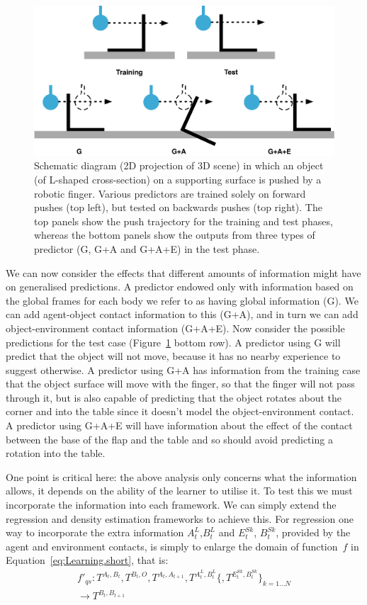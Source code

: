 \begin{figure}[b]
\centerline{\includegraphics[width=0.8\columnwidth]{BackPushToyExample}}
\caption[ToyExample]{Schematic diagram (2D projection of 3D scene)
in which an object (of L-shaped cross-section) on a supporting surface
is pushed by a robotic finger. 
Various predictors are trained solely on forward pushes (top left), but tested on backwards pushes (top right). The top panels show the push trajectory for the training and test phases, whereas the bottom panels show the outputs from three types of predictor (G, G+A and G+A+E) in the test phase.}
\label{fig:ToyExample}
\end{figure}

We can now consider the effects that different amounts of information
might have on generalised predictions. A predictor endowed only with
information based on the global frames for each body we refer to as
having global information (G). We can add agent-object contact
information to this (G+A), and in turn we can add object-environment
contact information (G+A+E). Now consider the possible predictions for
the test case (Figure~\ref{fig:ToyExample} bottom row). A predictor
using G will predict that the object will not move, because it has no
nearby experience to suggest otherwise. A predictor using G+A has
information from the training case that the object surface will move
with the finger, so that the finger will not pass through it, but is
also capable of predicting that the object rotates about the corner
and into the table since it doesn't model the object-environment
contact. A predictor using G+A+E will have information about the
effect of the contact between the base of the flap and the table and
so should avoid predicting a rotation into the table.

One point is critical here: the above analysis only concerns what the
information allows, it depends on the ability of the learner to
utilise it.  To test this we must incorporate the information into
each framework. We can simply extend the regression and density
estimation frameworks to achieve this. For regression one way to
incorporate the extra information $A^{L}_{t}$,$B^{L}_{t}$ and
$E^{Sk}_t$\hspace{-6pt}, $B^{Sk}_t$, provided by the agent and
environment contacts, is simply to enlarge the domain of function~$f$
in Equation~\eqref{eq:Learning.short}, that is:
\begin{multline}
f'_{qs}: T^{A_t, B_t}, T^{B_t, O}, T^{A_{t}, A_{t+1}}, T^{A^{L}_t, B^{L}_t}\{, T^{E^{Sk}_t,B^{Sk}_t}\}_{k=1 \ldots N} \\ 
\longrightarrow T^{B_{t}, B_{t+1}}
\label{eq:Learning.augmented}
\end{multline}

